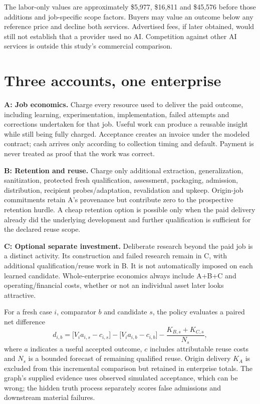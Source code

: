 \documentclass[11pt,letterpaper]{article}
\newcommand{\usd}[1]{\$#1}
\begin{document}
The labor-only values are approximately \usd{5,977}, \usd{16,811} and \usd{45,576} before those additions and job-specific scope factors. Buyers may value an outcome below any reference price and decline both services. Advertised fees, if later obtained, would still not establish that a provider used no AI. Competition against other AI services is outside this study's commercial comparison.

\section{Three accounts, one enterprise}

\textbf{A: Job economics.} Charge every resource used to deliver the paid outcome, including learning, experimentation, implementation, failed attempts and corrections undertaken for that job. Useful work can produce a reusable insight while still being fully charged. Acceptance creates an invoice under the modeled contract; cash arrives only according to collection timing and default. Payment is never treated as proof that the work was correct.

\textbf{B: Retention and reuse.} Charge only additional extraction, generalization, sanitization, protected fresh qualification, assessment, packaging, admission, distribution, recipient probes/adaptation, revalidation and upkeep. Origin-job commitments retain A's provenance but contribute zero to the prospective retention hurdle. A cheap retention option is possible only when the paid delivery already did the underlying development and further qualification is sufficient for the declared reuse scope.

\textbf{C: Optional separate investment.} Deliberate research beyond the paid job is a distinct activity. Its construction and failed research remain in C, with additional qualification/reuse work in B. It is not automatically imposed on each learned candidate. Whole-enterprise economics always include A+B+C and operating/financial costs, whether or not an individual asset later looks attractive.

For a fresh case $i$, comparator $b$ and candidate $s$, the policy evaluates a paired net difference
\begin{equation}
d_{i,b}=\bigl[V_i a_{i,s}-c_{i,s}\bigr]-\bigl[V_i a_{i,b}-c_{i,b}\bigr]
-\frac{K_{B,s}+K_{C,s}}{N_s},
\end{equation}
where $a$ indicates a useful accepted outcome, $c$ includes attributable reuse costs and $N_s$ is a bounded forecast of remaining qualified reuse. Origin delivery $K_A$ is excluded from this incremental comparison but retained in enterprise totals. The graph's supplied evidence uses observed simulated acceptance, which can be wrong; the hidden truth process separately scores false admissions and downstream material failures.
\end{document}
